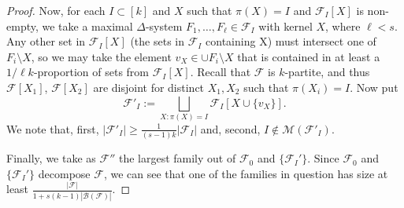 \documentclass[10pt,a4paper]{amsart}
\newcommand{\ff}{\mathcal{F}}
\newcommand{\m}{\mathcal}
\renewcommand{\ge}{\geqslant}
\begin{document}
\begin{proof}
       Now, for each $I\subset [k]$ and $X$ such that $\pi(X) = I$ and $\ff_I[X]$ is non-empty, we take a maximal $\Delta$-system $F_1,\ldots, F_\ell\in \ff_I$ with kernel $X$, where $\ell<s$. Any other set in $\ff_I[X]$ (the sets in $\ff_I$ containing X) must intersect one of $F_i\setminus X$, so we may take the element $v_X\in \cup F_i\setminus X$ that is contained in at least a $1/\ell k$-proportion of sets from $\ff_I[X]$. Recall that $\ff$ is $k$-partite, and thus $\ff[X_1]$, $\ff[X_2]$ are disjoint for distinct $X_1,X_2$ such that $\pi(X_i) = I$. Now put $$\ff'_I:=\bigsqcup_{X: \pi(X)=I} \ff_I[X\cup \{v_X\}].$$ We note that, first, $|\ff'_I|\ge \frac 1{(s-1)k}|\ff_I|$ and, second, $I\notin \m M(\ff'_I)$.



      Finally, we take as $\ff''$ the largest family out of  $\ff_0$ and $\{\ff_{I}'\}$. Since $\ff_0$ and $\{\ff_{I}'\}$ decompose $\ff$, we can see that one of the families in question has size at least $\frac{|\ff|}{1+s(k-1)|\m B(\ff)|}$.
    \end{proof}
\end{document}
